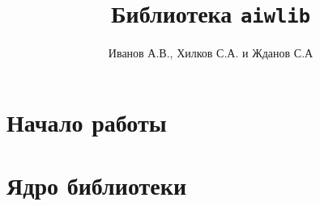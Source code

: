 \documentclass[12pt]{book}
\begin{document}
\title{Библиотека {\tt aiwlib}}
\author{
Иванов А.В., Хилков С.А. и Жданов С.А
}

\maketitle

\tableofcontents


\chapter{Начало работы} %
% 



\chapter{Ядро библиотеки}




\end{document}
